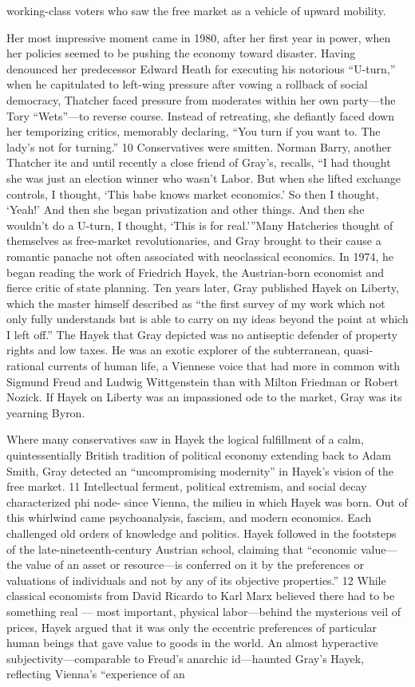 working-class voters who saw the free market as a vehicle of upward mobility.{\par} Her most impressive moment came in 1980, after her first year in power, when her policies seemed to be pushing the economy toward disaster. Having denounced her predecessor Edward Heath for executing his notorious “U-turn,” when he capitulated to left-wing pressure after vowing a rollback of social democracy, Thatcher faced pressure from moderates within her own party—the Tory “Wets”—to reverse course. Instead of retreating, she defiantly faced down her temporizing critics, memorably declaring, “You turn if you want to. The lady’s not for turning.” {\color{blue} 10 } Conservatives were smitten. Norman Barry, another Thatcher ite and until recently a close friend of Gray’s, recalls, “I had thought she was just an election winner who wasn’t Labor. But when she lifted exchange controls, I thought, ‘This babe knows market economics.’ So then I thought, ‘Yeah!’ And then she began privatization and other things. And then she wouldn’t do a U-turn, I thought, ‘This is for real.’”Many Hatcheries thought of themselves as free-market revolutionaries, and Gray brought to their cause a romantic panache not often associated with neoclassical economics. In 1974, he began reading the work of Friedrich Hayek, the Austrian-born economist and fierce critic of state planning. Ten years later, Gray published Hayek on Liberty, which the master himself described as “the first survey of my work which not only fully understands but is able to carry on my ideas beyond the point at which I left off.” The Hayek that Gray depicted was no antiseptic defender of property rights and low taxes. He was an exotic explorer of the subterranean, quasi-rational currents of human life, a Viennese voice that had more in common with Sigmund Freud and Ludwig Wittgenstein than with Milton Friedman or Robert Nozick. If Hayek on Liberty was an impassioned ode to the market, Gray was its yearning Byron.{\par} Where many conservatives saw in Hayek the logical fulfillment of a calm, quintessentially British tradition of political economy extending back to Adam Smith, Gray detected an “uncompromising modernity” in Hayek’s vision of the free market. {\color{blue} 11 } Intellectual ferment, political extremism, and social decay characterized phi node- since Vienna, the milieu in which Hayek was born. Out of this whirlwind came psychoanalysis, fascism, and modern economics. Each challenged old orders of knowledge and politics. Hayek followed in the footsteps of the late-nineteenth-century Austrian school, claiming that “economic value—the value of an asset or resource—is conferred on it by the preferences or valuations of individuals and not by any of its objective properties.” {\color{blue} 12 } While classical economists from David Ricardo to Karl Marx believed there had to be something real — most important, physical labor—behind the mysterious veil of prices, Hayek argued that it was only the eccentric preferences of particular human beings that gave value to goods in the world. An almost hyperactive subjectivity—comparable to Freud’s anarchic id—haunted Gray’s Hayek, reflecting Vienna’s “experience of an 